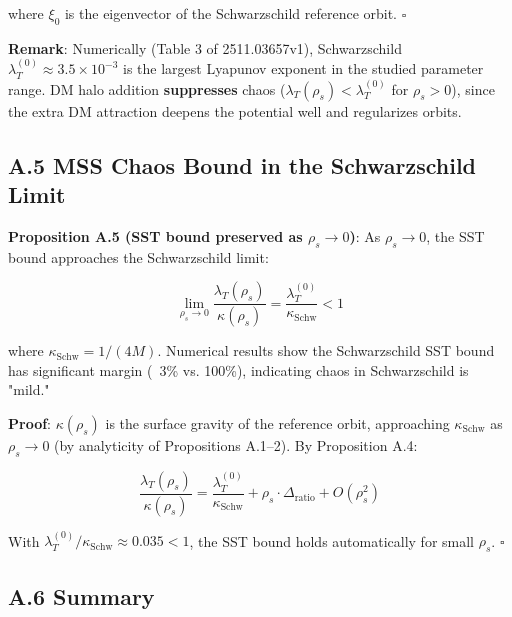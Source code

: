 \documentclass[12pt]{article}
\begin{document}
where $\xi_0$ is the eigenvector of the Schwarzschild reference orbit. $\square$

\textbf{Remark}: Numerically (Table 3 of 2511.03657v1), Schwarzschild $\lambda_T^{(0)} \approx 3.5 \times 10^{-3}$ is the largest Lyapunov exponent in the studied parameter range. DM halo addition \textbf{suppresses} chaos ($\lambda_T(\rho_s) < \lambda_T^{(0)}$ for $\rho_s > 0$), since the extra DM attraction deepens the potential well and regularizes orbits.

\subsection{A.5 MSS Chaos Bound in the Schwarzschild Limit}

\textbf{Proposition A.5 (SST bound preserved as $\rho_s \to 0$)}: As $\rho_s \to 0$, the SST bound approaches the Schwarzschild limit:

\begin{equation}
\lim_{\rho_s \to 0} \frac{\lambda_T(\rho_s)}{\kappa(\rho_s)} = \frac{\lambda_T^{(0)}}{\kappa_{\text{Schw}}} < 1
\end{equation}

where $\kappa_{\text{Schw}} = 1/(4M)$. Numerical results show the Schwarzschild SST bound has significant margin (~3\% vs. 100\%), indicating chaos in Schwarzschild is "mild."

\textbf{Proof}: $\kappa(\rho_s)$ is the surface gravity of the reference orbit, approaching $\kappa_{\text{Schw}}$ as $\rho_s \to 0$ (by analyticity of Propositions A.1--2). By Proposition A.4:

\begin{equation}
\frac{\lambda_T(\rho_s)}{\kappa(\rho_s)} = \frac{\lambda_T^{(0)}}{\kappa_{\text{Schw}}} + \rho_s \cdot \Delta_{\text{ratio}} + O(\rho_s^2)
\end{equation}

With $\lambda_T^{(0)} / \kappa_{\text{Schw}} \approx 0.035 < 1$, the SST bound holds automatically for small $\rho_s$. $\square$

\subsection{A.6 Summary}
\end{document}
